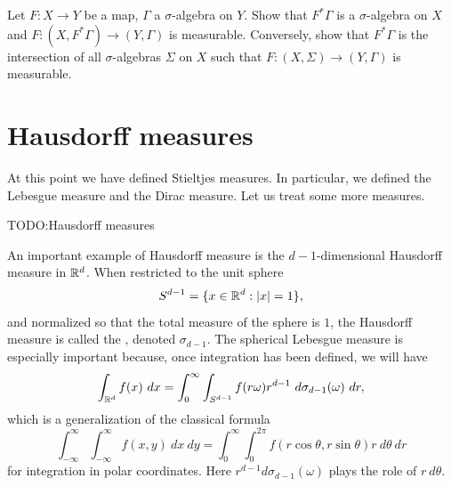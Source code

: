 
\begin{exercise}\label{pullback makes sense}
Let $F: X \to Y$ be a map, $\Gamma$ a $\sigma$-algebra on $Y$.
Show that $F^{*}\Gamma$ is a $\sigma$-algebra on $X$ and $F: (X, F^{*}\Gamma) \to (Y, \Gamma)$ is measurable.
Conversely, show that $F^{*}\Gamma$ is the intersection of all $\sigma$-algebras $\Sigma$ on $X$ such that $F: (X, \Sigma) \to (Y, \Gamma)$ is measurable.
\end{exercise}

\section{Hausdorff measures}
At this point we have defined Stieltjes measures.
In particular, we defined the Lebesgue measure and the Dirac measure.
Let us treat some more measures.

TODO:\@ Hausdorff measures


\begin{example}\label{Lebesgue measure on sphere}
An important example of Hausdorff measure is the $d-1$-dimensional Hausdorff measure in $\mathbb{R}^{d}$.
When restricted to the unit sphere
\[S^{d - 1} = \{x \in \mathbb{R}^{d}: |x| = 1\},\]
and normalized so that the total measure of the sphere is $1$, the Hausdorff measure is called the , denoted $\sigma_{d - 1}$.
The spherical Lebesgue measure is especially important because, once integration has been defined, we will have
\[\int_{\mathbb{R}^{d}} f(x) ~dx = \int_{0}^{\infty} \int_{S^{d - 1}} f(r\omega) r^{d - 1}~d\sigma_{d - 1}(\omega) ~dr,\]
which is a generalization of the classical formula
\[\int_{-\infty}^{\infty} \int_{-\infty}^{\infty} f(x, y) ~dx ~dy = \int_{0}^{\infty} \int_{0}^{2\pi} f(r \cos \theta, r \sin \theta) r~d\theta ~dr\]
for integration in polar coordinates. Here $r^{d - 1} d\sigma_{d - 1}(\omega)$ plays the role of $r~d\theta$.
\end{example}



